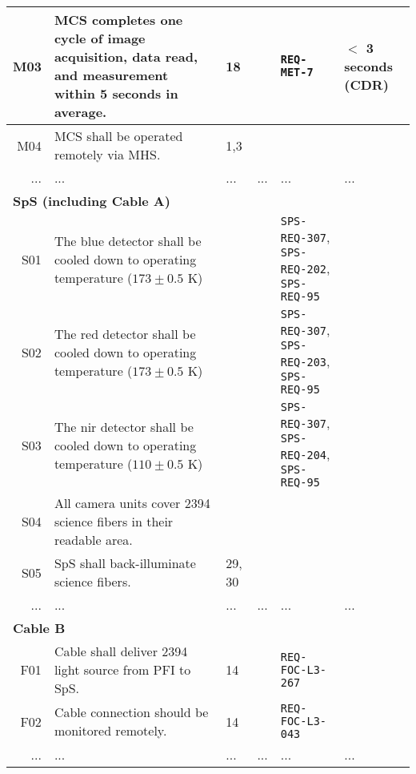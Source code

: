 \begin{landscape}
\begin{longtable}{r|p{80mm}|p{25mm}|c|p{30mm}|p{45mm}}
M03	& MCS completes one cycle of image acquisition, data read, and measurement within 5 seconds in average. 	& 18 	& 	& {\tt REQ-MET-7}	& $<$ 3 seconds (CDR) 	\\ \hline
M04	& MCS shall be operated remotely via MHS.	& 1,3	& 	& 	& 	\\ \hline
...	& ...	& ...	& ...	& ...	& ...	\\ \hline
\hline
\multicolumn{6}{l}{\hspace{5mm} {\bf SpS (including Cable A)}} \\ \hline
S01	& The blue detector shall be cooled down to operating temperature ($173 \pm 0.5$ K)	& 	& 	& {\tt SPS-REQ-307}, {\tt SPS-REQ-202}, {\tt SPS-REQ-95}	& 	\\ \hline
S02	& The red detector shall be cooled down to operating temperature ($173 \pm 0.5$ K)	& 	& 	& {\tt SPS-REQ-307}, {\tt SPS-REQ-203}, {\tt SPS-REQ-95}	& 	\\ \hline
S03	& The nir detector shall be cooled down to operating temperature ($110 \pm 0.5$ K)	& 	& 	& {\tt SPS-REQ-307}, {\tt SPS-REQ-204}, {\tt SPS-REQ-95}	& 	\\ \hline
S04	 & All camera units cover 2394 science fibers in their readable area.	& 	& 	& 	& 	\\ \hline
S05	 & SpS shall back-illuminate science fibers.	& 29, 30 	& 	& 	& 	\\ \hline
...	& ...	& ...	& ...	& ...	& ...	\\ \hline
\hline
\multicolumn{6}{l}{\hspace{5mm} {\bf Cable B}} \\ \hline
F01		& Cable shall deliver 2394 light source from PFI to SpS.	& 14	& 	& {\tt REQ-FOC-L3-267}	& 	\\ \hline
F02		& Cable connection should be monitored remotely. 	& 14	& 	& {\tt REQ-FOC-L3-043}	& 	\\ \hline
...	& ...	& ...	& ...	& ...	& ...	\\ \hline
\end{longtable}
\end{landscape}